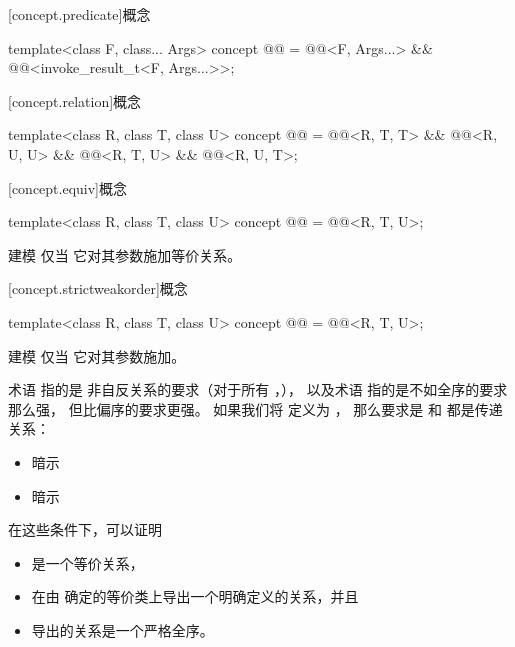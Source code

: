 [concept.predicate]{概念 }

\begin{itemdecl}
template<class F, class... Args>
  concept @@ =
    @@<F, Args...> && @@<invoke_result_t<F, Args...>>;
\end{itemdecl}

[concept.relation]{概念 }

\begin{itemdecl}
template<class R, class T, class U>
  concept @@ =
    @@<R, T, T> && @@<R, U, U> &&
    @@<R, T, U> && @@<R, U, T>;
\end{itemdecl}

[concept.equiv]{概念 }

\begin{itemdecl}
template<class R, class T, class U>
  concept @@ = @@<R, T, U>;
\end{itemdecl}

\begin{itemdescr}
\pnum
{} 建模  仅当
它对其参数施加等价关系。
\end{itemdescr}

[concept.strictweakorder]{概念 }

\begin{itemdecl}
template<class R, class T, class U>
  concept @@ = @@<R, T, U>;
\end{itemdecl}

\begin{itemdescr}
\pnum
{} 建模  仅当
它对其参数施加。

\pnum
术语
指的是
非自反关系的要求（对于所有 ，），
以及术语
指的是不如全序的要求那么强，
但比偏序的要求更强。
如果我们将
定义为
，
那么要求是
和
都是传递关系：

\begin{itemize}
\item
{}
暗示
\item
{}
暗示
\end{itemize}

\pnum
\begin{note}
在这些条件下，可以证明
\begin{itemize}
\item
{}
是一个等价关系，
\item
{}
在由  确定的等价类上导出一个明确定义的关系，并且
\item
导出的关系是一个严格全序。
\end{itemize}
\end{note}
\end{itemdescr}

